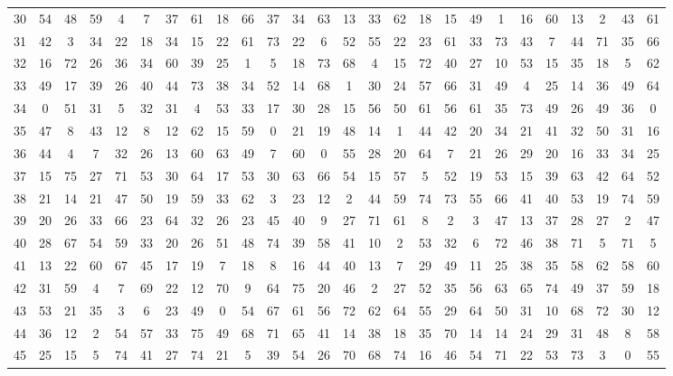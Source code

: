 \begin{table}
\begin{tabular}{c c c c c c c c c c c c c c c c c c c c c c c c c c }
30 & 54 & 48 & 59 & 4 & 7 & 37 & 61 & 18 & 66 & 37 & 34 & 63 & 13 & 33 & 62 & 18 & 15 & 49 & 1 & 16 & 60 & 13 & 2 & 43 & 61 \\
31 & 42 & 3 & 34 & 22 & 18 & 34 & 15 & 22 & 61 & 73 & 22 & 6 & 52 & 55 & 22 & 23 & 61 & 33 & 73 & 43 & 7 & 44 & 71 & 35 & 66 \\
32 & 16 & 72 & 26 & 36 & 34 & 60 & 39 & 25 & 1 & 5 & 18 & 73 & 68 & 4 & 15 & 72 & 40 & 27 & 10 & 53 & 15 & 35 & 18 & 5 & 62 \\
33 & 49 & 17 & 39 & 26 & 40 & 44 & 73 & 38 & 34 & 52 & 14 & 68 & 1 & 30 & 24 & 57 & 66 & 31 & 49 & 4 & 25 & 14 & 36 & 49 & 64 \\
34 & 0 & 51 & 31 & 5 & 32 & 31 & 4 & 53 & 33 & 17 & 30 & 28 & 15 & 56 & 50 & 61 & 56 & 61 & 35 & 73 & 49 & 26 & 49 & 36 & 0 \\
35 & 47 & 8 & 43 & 12 & 8 & 12 & 62 & 15 & 59 & 0 & 21 & 19 & 48 & 14 & 1 & 44 & 42 & 20 & 34 & 21 & 41 & 32 & 50 & 31 & 16 \\
36 & 44 & 4 & 7 & 32 & 26 & 13 & 60 & 63 & 49 & 7 & 60 & 0 & 55 & 28 & 20 & 64 & 7 & 21 & 26 & 29 & 20 & 16 & 33 & 34 & 25 \\
37 & 15 & 75 & 27 & 71 & 53 & 30 & 64 & 17 & 53 & 30 & 63 & 66 & 54 & 15 & 57 & 5 & 52 & 19 & 53 & 15 & 39 & 63 & 42 & 64 & 52 \\
38 & 21 & 14 & 21 & 47 & 50 & 19 & 59 & 33 & 62 & 3 & 23 & 12 & 2 & 44 & 59 & 74 & 73 & 55 & 66 & 41 & 40 & 53 & 19 & 74 & 59 \\
39 & 20 & 26 & 33 & 66 & 23 & 64 & 32 & 26 & 23 & 45 & 40 & 9 & 27 & 71 & 61 & 8 & 2 & 3 & 47 & 13 & 37 & 28 & 27 & 2 & 47 \\
40 & 28 & 67 & 54 & 59 & 33 & 20 & 26 & 51 & 48 & 74 & 39 & 58 & 41 & 10 & 2 & 53 & 32 & 6 & 72 & 46 & 38 & 71 & 5 & 71 & 5 \\
41 & 13 & 22 & 60 & 67 & 45 & 17 & 19 & 7 & 18 & 8 & 16 & 44 & 40 & 13 & 7 & 29 & 49 & 11 & 25 & 38 & 35 & 58 & 62 & 58 & 60 \\
42 & 31 & 59 & 4 & 7 & 69 & 22 & 12 & 70 & 9 & 64 & 75 & 20 & 46 & 2 & 27 & 52 & 35 & 56 & 63 & 65 & 74 & 49 & 37 & 59 & 18 \\
43 & 53 & 21 & 35 & 3 & 6 & 23 & 49 & 0 & 54 & 67 & 61 & 56 & 72 & 62 & 64 & 55 & 29 & 64 & 50 & 31 & 10 & 68 & 72 & 30 & 12 \\
44 & 36 & 12 & 2 & 54 & 57 & 33 & 75 & 49 & 68 & 71 & 65 & 41 & 14 & 38 & 18 & 35 & 70 & 14 & 14 & 24 & 29 & 31 & 48 & 8 & 58 \\
45 & 25 & 15 & 5 & 74 & 41 & 27 & 74 & 21 & 5 & 39 & 54 & 26 & 70 & 68 & 74 & 16 & 46 & 54 & 71 & 22 & 53 & 73 & 3 & 0 & 55 \\

\end{tabular}
\end{table}
